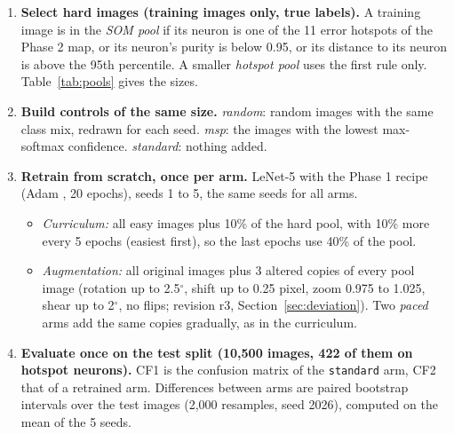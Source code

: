 \documentclass[11pt]{article}
\begin{document}
\begin{enumerate}[leftmargin=1.6em, itemsep=1pt]
  \item \textbf{Select hard images (training images only, true labels).} A training image is in the \emph{SOM pool} if its neuron is one of the 11 error hotspots of the Phase 2 map, or its neuron's purity is below 0.95, or its distance to its neuron is above the 95th percentile. A smaller \emph{hotspot pool} uses the first rule only. Table~\ref{tab:pools} gives the sizes.
  \item \textbf{Build controls of the same size.} \emph{random}: random images with the same class mix, redrawn for each seed. \emph{msp}: the images with the lowest max-softmax confidence. \emph{standard}: nothing added.
  \item \textbf{Retrain from scratch, once per arm.} LeNet-5 \parencite{lecun1998gradient} with the Phase 1 recipe (Adam \parencite{kingma2015adam}, 20 epochs), seeds 1 to 5, the same seeds for all arms.
  \begin{itemize}[leftmargin=1.2em, itemsep=0pt]
    \item \emph{Curriculum:} all easy images plus 10\% of the hard pool, with 10\% more every 5 epochs (easiest first), so the last epochs use 40\% of the pool.
    \item \emph{Augmentation:} all original images plus 3 altered copies of every pool image (rotation up to 2.5$^\circ$, shift up to 0.25 pixel, zoom 0.975 to 1.025, shear up to 2$^\circ$, no flips; revision r3, Section~\ref{sec:deviation}). Two \emph{paced} arms add the same copies gradually, as in the curriculum.
  \end{itemize}
  \item \textbf{Evaluate once on the test split (10{,}500 images, 422 of them on hotspot neurons).} CF1 is the confusion matrix of the \texttt{standard} arm, CF2 that of a retrained arm. Differences between arms are paired bootstrap intervals over the test images (2{,}000 resamples, seed 2026), computed on the mean of the 5 seeds.
\end{enumerate}
\end{document}
